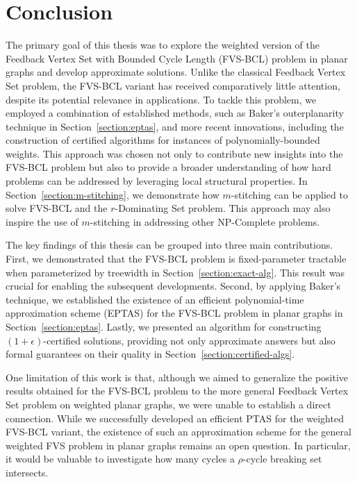 \section{Conclusion}

The primary goal of this thesis was to explore the weighted version of the Feedback Vertex Set 
with Bounded Cycle Length (FVS-BCL) problem in planar graphs and develop approximate solutions. 
Unlike the classical Feedback Vertex Set problem, the FVS-BCL variant has received comparatively 
little attention, despite its potential relevance in applications. To tackle this problem, we 
employed a combination of established methods, such as Baker's outerplanarity technique in Section~\ref{section:eptas}, 
and more recent innovations, including the construction of certified algorithms for instances 
of polynomially-bounded weights. 
This approach was chosen not only to contribute new insights into the FVS-BCL problem but also 
to provide a broader understanding of how hard problems can be addressed by leveraging 
local structural properties. 
In Section~\ref{section:m-stitching}, we demonstrate how $m$-stitching can be applied to 
solve FVS-BCL and the $r$-Dominating Set problem. 
This approach may also inspire the use of $m$-stitching in addressing other NP-Complete problems.
 
The key findings of this thesis can be grouped into three main contributions. 
First, we demonstrated that the FVS-BCL problem is fixed-parameter tractable when parameterized 
by treewidth in Section~\ref{section:exact-alg}. This result was crucial for enabling the subsequent developments. 
Second, by applying Baker's technique, we established the existence of an efficient 
polynomial-time approximation scheme (EPTAS) for the FVS-BCL problem in planar graphs in 
Section~\ref{section:eptas}. 
Lastly, we presented an algorithm for constructing $(1 + \epsilon)$-certified solutions, 
providing not only approximate answers but also formal guarantees on their quality 
in Section~\ref{section:certified-algs}.

One limitation of this work is that, although we aimed to generalize the positive results 
obtained for the FVS-BCL problem to the more general Feedback Vertex Set problem on 
weighted planar graphs, we were unable to establish a direct connection. 
While we successfully developed an efficient PTAS for the weighted FVS-BCL variant, 
the existence of such an approximation scheme for the general weighted FVS problem 
in planar graphs remains an open question. In particular, it would be valuable to investigate 
how many cycles a $\rho$-cycle breaking set intersects.

